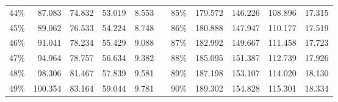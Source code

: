 \documentclass[12pt]{article}
\begin{document}
\begin{center}
\begin{tabular}{|c|r|r|r|r|r|c|r|r|r|r|}
    44\%                      & 87.083                             & 74.832                              & 53.019                              & 8.553                              &                                & 85\%                      & 179.572                            & 146.226                             & 108.896                             & 17.315                             \\ \cline{1-5} \cline{7-11} 
    45\%                      & 89.062                             & 76.533                              & 54.224                              & 8.748                              &                                & 86\%                      & 180.888                            & 147.947                             & 110.177                             & 17.519                             \\ \cline{1-5} \cline{7-11} 
    46\%                      & 91.041                             & 78.234                              & 55.429                              & 9.088                              &                                & 87\%                      & 182.992                            & 149.667                             & 111.458                             & 17.723                             \\ \cline{1-5} \cline{7-11} 
    47\%                      & 94.964                             & 78.757                              & 56.634                              & 9.382                              &                                & 88\%                      & 185.095                            & 151.387                             & 112.739                             & 17.926                             \\ \cline{1-5} \cline{7-11} 
    48\%                      & 98.306                             & 81.467                              & 57.839                              & 9.581                              &                                & 89\%                      & 187.198                            & 153.107                             & 114.020                             & 18.130                             \\ \cline{1-5} \cline{7-11} 
    49\%                      & 100.354                            & 83.164                              & 59.044                              & 9.781                              &                                & 90\%                      & 189.302                            & 154.828                             & 115.301                             & 18.334                             \\ \cline{1-5} \cline{7-11} 

\end{tabular}
\end{center}
\end{document}
